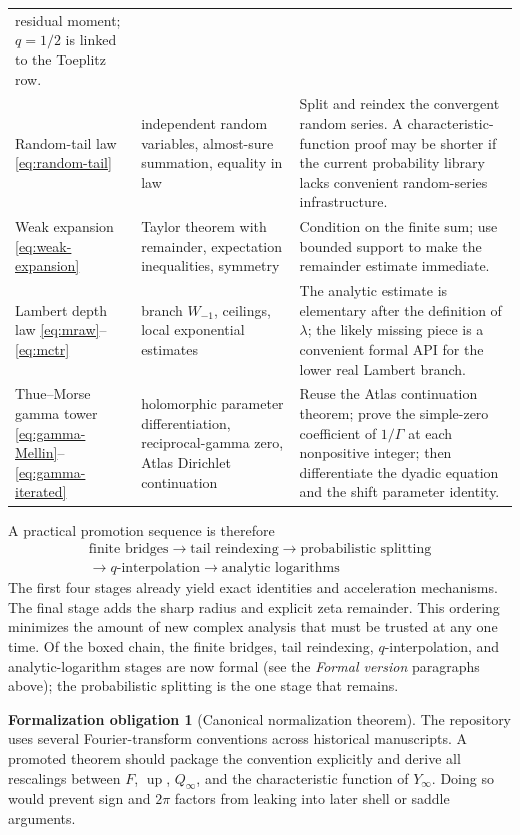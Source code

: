 \documentclass[11pt,oneside]{article}
\numberwithin{equation}{section}
\theoremstyle{definition}
\newtheorem{obligation}[theorem]{Formalization obligation}
\theoremstyle{remark}
\newcommand{\Up}{\operatorname{up}}
\begin{document}
\begin{longtable}{@{}p{}p{}p{}@{}}
residual moment; \(q=1/2\) is linked to the Toeplitz row. \\
Random-tail law
\eqref{eq:random-tail} & independent random variables, almost-sure summation, equality in law &
Split and reindex the convergent random series.  A characteristic-function proof may be
shorter if the current probability library lacks convenient random-series infrastructure. \\
Weak expansion
\eqref{eq:weak-expansion} & Taylor theorem with remainder, expectation inequalities, symmetry &
Condition on the finite sum; use bounded support to make the remainder estimate immediate. \\
Lambert depth law
\eqref{eq:mraw}--\eqref{eq:mctr} & branch $W_{-1}$, ceilings, local exponential estimates & The
analytic estimate is elementary after the definition of $\lambda$; the likely missing piece is
a convenient formal API for the lower real Lambert branch. \\
Thue--Morse gamma tower
\eqref{eq:gamma-Mellin}--\eqref{eq:gamma-iterated} & holomorphic parameter differentiation,
reciprocal-gamma zero, Atlas Dirichlet continuation & Reuse the Atlas continuation theorem;
prove the simple-zero coefficient of $1/\Gamma$ at each nonpositive integer; then
differentiate the dyadic equation and the shift parameter identity. \\
\bottomrule
\end{longtable}
\endgroup

A practical promotion sequence is therefore
\[
 \boxed{\begin{gathered}
 \text{finite bridges}
 \longrightarrow \text{tail reindexing}
 \longrightarrow \text{probabilistic splitting}\\
 \longrightarrow \text{$q$-interpolation}
 \longrightarrow \text{analytic logarithms}
 \end{gathered}}
\]
The first four stages already yield exact identities and acceleration mechanisms.  The final
stage adds the sharp radius and explicit zeta remainder.  This ordering minimizes the amount
of new complex analysis that must be trusted at any one time.  Of the boxed chain, the
finite bridges, tail reindexing, $q$-interpolation, and analytic-logarithm stages are now
formal (see the \emph{Formal version} paragraphs above); the probabilistic splitting is the
one stage that remains.

\begin{obligation}[Canonical normalization theorem]
The repository uses several Fourier-transform conventions across historical manuscripts.
A promoted theorem should package the convention explicitly and derive all rescalings between
$F$, $\Up$, $Q_\infty$, and the characteristic function of $Y_\infty$.  Doing so would prevent
sign and $2\pi$ factors from leaking into later shell or saddle arguments.
\end{obligation}
\end{document}
